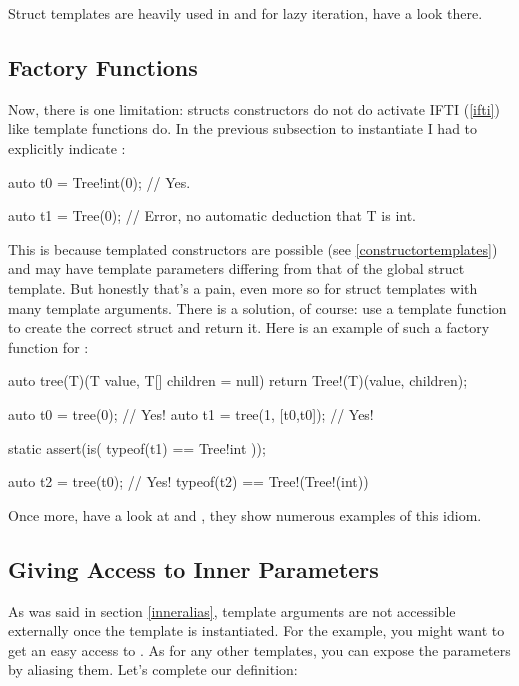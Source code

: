 Struct templates are heavily used in  and  for lazy iteration, have a look there.

\subsection{Factory Functions}\label{factory}

Now, there is one limitation: structs constructors do not do activate IFTI (\ref{ifti}) like template functions do. In the previous subsection to instantiate  I had to explicitly indicate :

\begin{dcode}
auto t0 = Tree!int(0); // Yes.

auto t1 = Tree(0); // Error, no automatic deduction that T is int.
\end{dcode}

This is because templated constructors are possible (see \ref{constructortemplates}) and may have template parameters differing from that of the global struct template. But honestly that's a pain, even more so for struct templates with many template arguments. There is a solution, of course: use a template function to create the correct struct and return it. Here is an example of such a factory function for :

\begin{dcode}
auto tree(T)(T value, T[] children = null) 
{
    return Tree!(T)(value, children);
}

auto t0 = tree(0); // Yes!
auto t1 = tree(1, [t0,t0]); // Yes!

static assert(is( typeof(t1) == Tree!int ));

auto t2 = tree(t0); // Yes! typeof(t2) == Tree!(Tree!(int)) 
\end{dcode}

Once more, have a look at  and , they show numerous examples of this idiom.

\subsection{Giving Access to Inner Parameters}\label{givingaccess}

As was said in section \ref{inneralias}, template arguments are not accessible externally once the template is instantiated. For the  example, you might want to get an easy access to . As for any other templates, you can expose the parameters by aliasing them. Let's complete our  definition:


